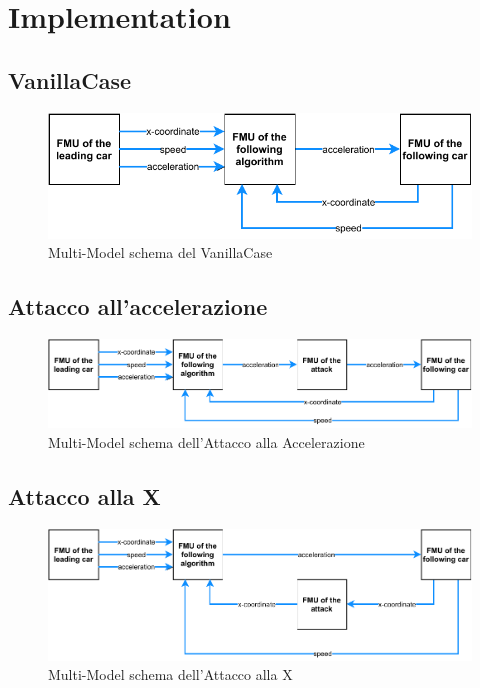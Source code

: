 \section{Implementation}
\subsection{VanillaCase}
\begin{figure}[h]
	\centering
	\includegraphics{img/VanillaSchema.pdf}
	\caption{Multi-Model schema del VanillaCase}
\end{figure}

\subsection{Attacco all'accelerazione}
\begin{figure}[h]
	\centering
	\includegraphics{img/AccelAttackSchema.pdf}
	\caption{Multi-Model schema dell'Attacco alla Accelerazione}
\end{figure}
\subsection{Attacco alla X}
\begin{figure}[h]
	\centering
	\includegraphics{img/XAttackSchema.pdf}
	\caption{Multi-Model schema dell'Attacco alla X}
\end{figure}
